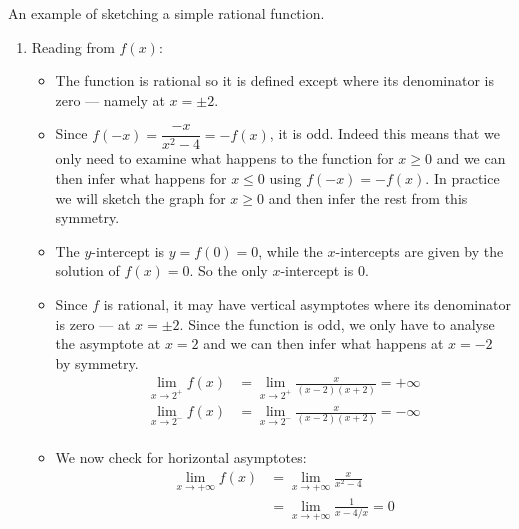 An example of sketching a simple rational function.
\begin{eg}[$f(x) = \dfrac{x}{x^2-4}$]
\begin{enumerate}[(1)]
\item Reading from $f(x)$:
\begin{itemize}
 \item The function is rational so it is defined except where its denominator
is zero --- namely at $x=\pm2$.

\item Since $f(-x) = \dfrac{-x}{x^2-4} = - f(x)$, it is odd. Indeed this means
that we only need to examine what happens to the function for $x \geq 0$ and we
can then infer what happens for $x\leq 0$ using $f(-x) = -f(x)$. In
practice we will sketch the graph for $x\geq0$ and then infer the rest
from this symmetry.

\item The $y$-intercept is $y=f(0)=0$, while the $x$-intercepts are given by
the solution of $f(x)=0$. So the only $x$-intercept is $0$.

\item Since $f$ is rational, it may have vertical asymptotes where its
denominator is zero --- at $x=\pm 2$. Since the function is odd, we only have
to analyse the asymptote at $x=2$ and we can then infer what happens at $x=-2$
by symmetry.
\begin{align*}
  \lim_{x\to 2^+} f(x)
  &= \lim_{x\to 2^+} \frac{x}{(x-2)(x+2)} = + \infty \\
  \lim_{x\to 2^-} f(x) &=
  \lim_{x\to 2^-} \frac{x}{(x-2)(x+2)} = - \infty \\
\end{align*}

\item We now check for horizontal asymptotes:
\begin{align*}
\lim_{x\to +\infty} f(x)
&= \lim_{x\to +\infty} \frac{x}{x^2-4} \\
&= \lim_{x\to +\infty} \frac{1}{x-4/x} = 0
\end{align*}
\end{itemize}



\end{enumerate}
\end{eg}
